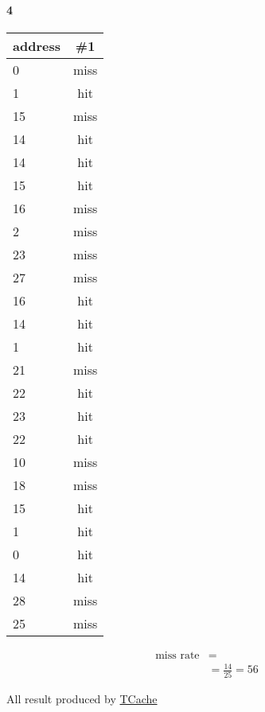 \documentclass[11pt]{article}
\begin{document}
\paragraph{4}
\begin{center}
	\begin{tabular}{l || c}
		address & \#1 \\
		\hline
		0  & miss \\
		1  & hit  \\
		15 & miss \\
		14 & hit  \\
		14 & hit  \\
		15 & hit  \\
		16 & miss \\
		2  & miss \\
		23 & miss \\
		27 & miss \\
		16 & hit  \\
		14 & hit  \\
		1  & hit  \\
		21 & miss \\
		22 & hit  \\
		23 & hit  \\
		22 & hit  \\
		10 & miss \\
		18 & miss \\
		15 & hit  \\
		1  & hit  \\
		0  & hit  \\
		14 & hit  \\
		28 & miss \\
		25 & miss \\
	\end{tabular}
	\begin{align*}
		\text{miss rate} &= \\
		&= \frac{14}{25} = 56%
	\end{align*}
	\begin{latin}
		All result produced by \href{https://github.com/1995parham/TCache}{TCache}
	\end{latin}
\end{center}
\end{document}
